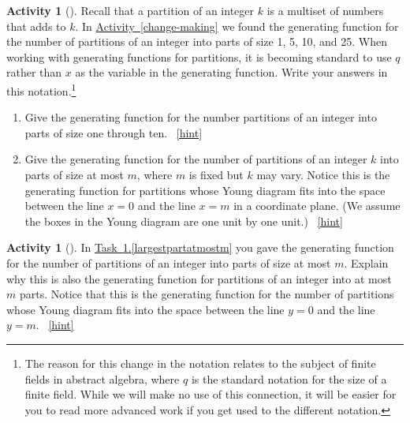 \documentclass[10pt,]{book}
\theoremstyle{plain}
\theoremstyle{definition}
\theoremstyle{definition}
\theoremstyle{definition}
\newtheorem{activity}[project]{Activity}
\numberwithin{equation}{chapter}
\begin{document}
\begin{activity}[]\label{activity-255}
\hypertarget{p-1158}{}%
Recall that a partition of an integer \(k\) is a multiset of numbers that adds to \(k\). In \hyperref[change-making]{Activity~\ref{change-making}} we found the generating function for the number of partitions of an integer into parts of size 1, 5, 10, and 25. When working with generating functions for partitions, it is becoming standard to use \(q\) rather than \(x\) as the variable in the generating function.  Write your answers in this notation.\footnote{The reason for this change in the notation relates to the subject of finite fields in abstract algebra, where \(q\) is the standard notation for the size of a finite field.  While we will make no use of this connection, it will be easier for you to read more advanced work if you get used to the different notation.\label{fn-12}}%
\begin{enumerate}[font=\bfseries,label=(\alph*),ref=\alph*]
\item\label{task-200} \hypertarget{p-1159}{}%
Give the generating function for the number partitions of an integer into parts of size one through ten.%
~\hfill{\tiny\hyperlink{a-255.a}{[hint]}\hypertarget{q-255.a}{}}\item\label{largestpartatmostm} \hypertarget{p-1162}{}%
Give the generating function for the number of partitions of an integer \(k\) into parts of size at most \(m\), where \(m\) is fixed but \(k\) may vary. Notice this is the generating function for partitions whose Young diagram fits into the space between the line \(x=0\) and the line \(x=m\) in a coordinate plane. (We assume the boxes in the Young diagram are one unit by one unit.)%
~\hfill{\tiny\hyperlink{a-255.b}{[hint]}\hypertarget{q-255.b}{}}\end{enumerate}
\end{activity}
\begin{activity}[]\label{atmostmparts}
\hypertarget{p-1165}{}%
In \hyperref[largestpartatmostm]{Task~\ref{activity-255}.\ref{largestpartatmostm}} you gave the generating function for the number of partitions of an integer into parts of size at most \(m\). Explain why this is also the generating function for partitions of an integer into at most \(m\) parts. Notice that this is the generating function for the number of partitions whose Young diagram fits into the space between the line \(y=0\) and the line \(y=m\).%
~\hfill{\tiny\hyperlink{a-256}{[hint]}\hypertarget{q-256}{}}\end{activity}
\end{document}
